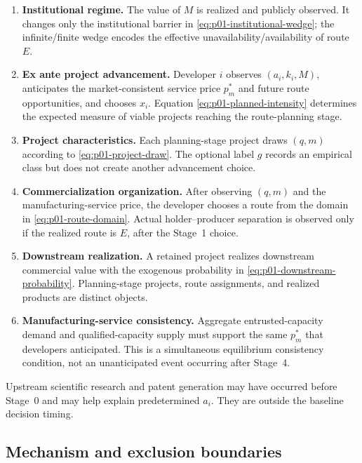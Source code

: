 \begin{enumerate}
  \item[Stage 0.] \textbf{Institutional regime.}  The value of \(M\) is
  realized and publicly observed.  It changes only the institutional barrier
  in \eqref{eq:p01-institutional-wedge}; the infinite/finite wedge encodes the
  effective unavailability/availability of route \(E\).

  \item[Stage 1.] \textbf{Ex ante project advancement.}  Developer \(i\)
  observes \((a_i,k_i,M)\), anticipates the market-consistent service price
  \(p_m^*\) and future route opportunities, and chooses \(x_i\).  Equation
  \eqref{eq:p01-planned-intensity} determines the expected measure of viable
  projects reaching the route-planning stage.

  \item[Stage 2.] \textbf{Project characteristics.}  Each planning-stage
  project draws \((q,m)\) according to \eqref{eq:p01-project-draw}.  The
  optional label \(g\) records an empirical class but does not create another
  advancement choice.

  \item[Stage 3.] \textbf{Commercialization organization.}  After observing
  \((q,m)\) and the manufacturing-service price, the developer chooses a route
  from the domain in \eqref{eq:p01-route-domain}. Actual holder--producer
  separation is observed only if the realized route is \(E\), after the
  Stage~1 choice.

  \item[Stage 4.] \textbf{Downstream realization.}  A retained project
  realizes downstream commercial value with the exogenous probability in
  \eqref{eq:p01-downstream-probability}.  Planning-stage projects, route
  assignments, and realized products are distinct objects.

  \item[Stage 5.] \textbf{Manufacturing-service consistency.}  Aggregate
  entrusted-capacity demand and qualified-capacity supply must support the same
  \(p_m^*\) that developers anticipated.  This is a simultaneous equilibrium
  consistency condition, not an unanticipated event occurring after Stage~4.
\end{enumerate}

Upstream scientific research and patent generation may have occurred before
Stage~0 and may help explain predetermined \(a_i\).  They are outside the
baseline decision timing.

\subsection{Mechanism and exclusion boundaries}
\label{subsec:p01-mechanism-boundary}

